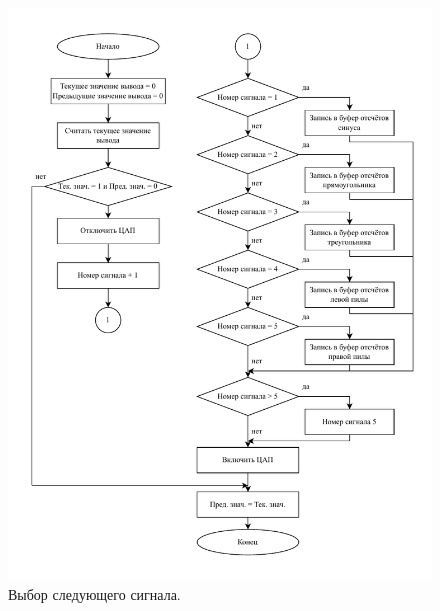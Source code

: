 	\begin{figure}[H]
    \centering
    \includegraphics[width=1\textwidth]{../image/plus_signal.pdf}
    \caption{Выбор следующего сигнала.}
	\end{figure}	
	
